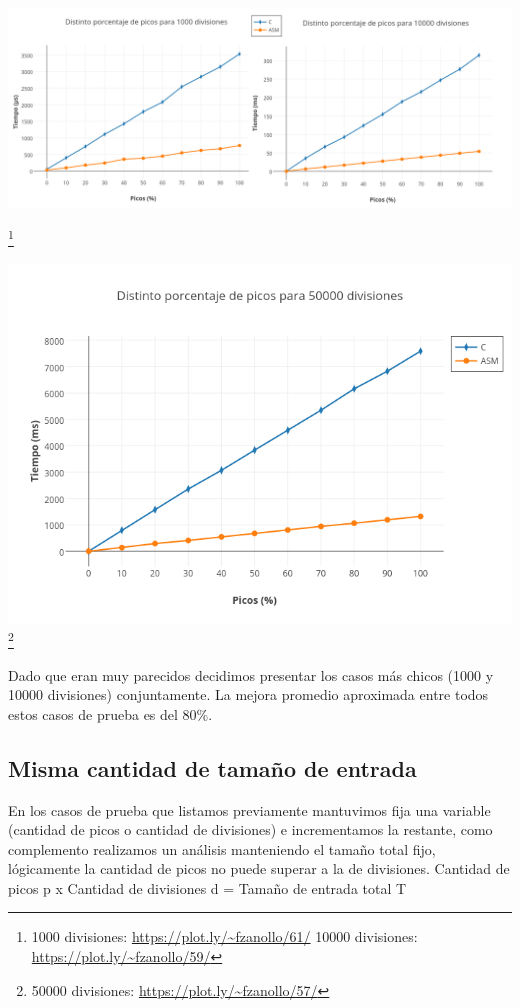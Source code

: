 \centerline{\includegraphics[scale=0.45]{imagenes/distintosPicosParaDivisiones.png}}\footnote{ 1000 divisiones: \url{https://plot.ly/~fzanollo/61/} 10000 divisiones: \url{https://plot.ly/~fzanollo/59/}} 

\includegraphics[scale=0.6]{imagenes/distintosPicos50000divisiones.png} \footnote{ 50000 divisiones: \url{https://plot.ly/~fzanollo/57/}} 

Dado que eran muy parecidos decidimos presentar los casos más chicos (1000 y 10000 divisiones) conjuntamente. La mejora promedio aproximada entre todos estos casos de prueba es del 80$\%$.

\newpage
\subsection{Misma cantidad de tamaño de entrada}

En los casos de prueba que listamos previamente mantuvimos fija una variable (cantidad de picos o cantidad de divisiones) e incrementamos la restante, como complemento realizamos un análisis manteniendo el tamaño total fijo, lógicamente la cantidad de picos no puede superar a la de divisiones.
Cantidad de picos p x Cantidad de divisiones d = Tamaño de entrada total T

